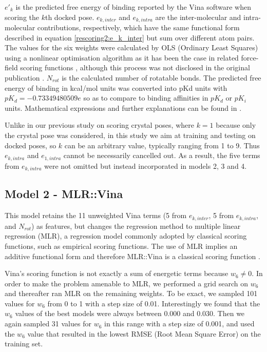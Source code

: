 \documentclass[twocolumn]{bmcart}
\begin{document}
$e'_k$ is the predicted free energy of binding reported by the Vina software when scoring the $k$th docked pose. $e_{k,inter}$ and $e_{k,intra}$ are the inter-molecular and intra-molecular contributions, respectively, which have the same functional form described in equation \ref{rescoring2:e_k_inter} but sum over different atom pairs. The values for the six weights were calculated by OLS (Ordinary Least Squares) using a nonlinear optimisation algorithm as it has been the case in related force-field scoring functions \cite{1454}, although this process was not disclosed in the original publication \cite{595}. $N_{rot}$ is the calculated number of rotatable bonds. The predicted free energy of binding in kcal/mol units was converted into pKd units with $pK_d=-0.73349480509e$ so as to compare to binding affinities in $pK_d$ or $pK_i$ units. Mathematical expressions and further explanations can be found in \cite{1362}.

Unlike in our previous study \cite{1647} on scoring crystal poses, where $k=1$ because only the crystal pose was considered, in this study we aim at training and testing on docked poses, so $k$ can be an arbitrary value, typically ranging from 1 to 9. Thus $e_{k,intra}$ and $e_{1,intra}$ cannot be necessarily cancelled out. As a result, the five terms from $e_{k,intra}$ were not omitted but instead incorporated in models 2, 3 and 4.

\subsection*{Model 2 - MLR::Vina}

This model retains the 11 unweighted Vina terms (5 from $e_{k,inter}$, 5 from $e_{k,intra}$, and $N_{rot}$) as features, but changes the regression method to multiple linear regression (MLR), a regression model commonly adopted by classical scoring functions, such as empirical scoring functions. The use of MLR implies an additive functional form and therefore MLR::Vina is a classical scoring function \cite{1647}.

Vina's scoring function is not exactly a sum of energetic terms because $w_6\neq0$. In order to make the problem amenable to MLR, we performed a grid search on $w_6$ and thereafter ran MLR on the remaining weights. To be exact, we sampled 101 values for $w_6$ from 0 to 1 with a step size of 0.01. Interestingly we found that the $w_6$ values of the best models were always between 0.000 and 0.030. Then we again sampled 31 values for $w_6$ in this range with a step size of 0.001, and used the $w_6$ value that resulted in the lowest RMSE (Root Mean Square Error) on the training set.
\end{document}
